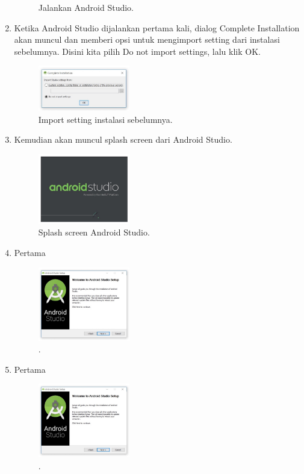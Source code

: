 \begin{enumerate}
\begin{figure}[H]
		\centering
		\caption{Jalankan Android Studio.}
	\end{figure}
	\item Ketika Android Studio dijalankan pertama kali, dialog Complete Installation akan muncul dan memberi opsi untuk mengimport setting dari instalasi sebelumnya. Disini kita pilih Do not import settings, lalu klik OK.
	\begin{figure}[H]
		\includegraphics[width=4cm]{figures/installas/8.jpg}
		\centering
		\caption{Import setting instalasi sebelumnya.}
	\end{figure}
	
	\item Kemudian akan muncul splash screen dari Android Studio.
	\begin{figure}[H]
		\includegraphics[width=4cm]{figures/installas/9.jpg}
		\centering
		\caption{Splash screen Android Studio.}
	\end{figure}
	
	\item Pertama
	\begin{figure}[H]
		\includegraphics[width=4cm]{figures/installas/1.jpg}
		\centering
		\caption{.}
	\end{figure}
	
	\item Pertama
	\begin{figure}[H]
		\includegraphics[width=4cm]{figures/installas/1.jpg}
		\centering
		\caption{.}
	\end{figure}
	

\end{enumerate}
